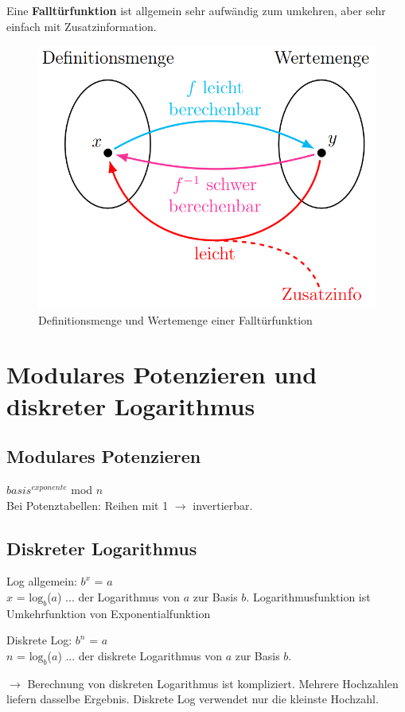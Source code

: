 Eine \textbf{Falltürfunktion} ist allgemein sehr aufwändig zum umkehren, aber sehr einfach mit Zusatzinformation.
\begin{figure}[H]
	\centering
	\includegraphics[width=0.8\linewidth]{figures/falltur_func.png}
	\caption{Definitionsmenge und Wertemenge einer Falltürfunktion}
\end{figure}

\section{Modulares Potenzieren und diskreter Logarithmus}
\subsection{Modulares Potenzieren}
$basis^{exponente}$ mod $n$ \\
Bei Potenztabellen: Reihen mit 1 $\rightarrow$ invertierbar.

\subsection{Diskreter Logarithmus}
Log allgemein: $b^{x}$ = $a$ \\
$x$ = $\text{log}_b$($a$) ... der Logarithmus von $a$ zur Basis $b$. Logarithmusfunktion ist Umkehrfunktion von Exponentialfunktion

Diskrete Log: $b^{n}$ = $a$ \\
$n$ = $\text{log}_b$($a$) ... der diskrete Logarithmus von $a$ zur Basis $b$.

$\rightarrow$ Berechnung von diskreten Logarithmus ist kompliziert. Mehrere Hochzahlen liefern dasselbe Ergebnis. Diskrete Log verwendet nur die kleinste Hochzahl. \\

